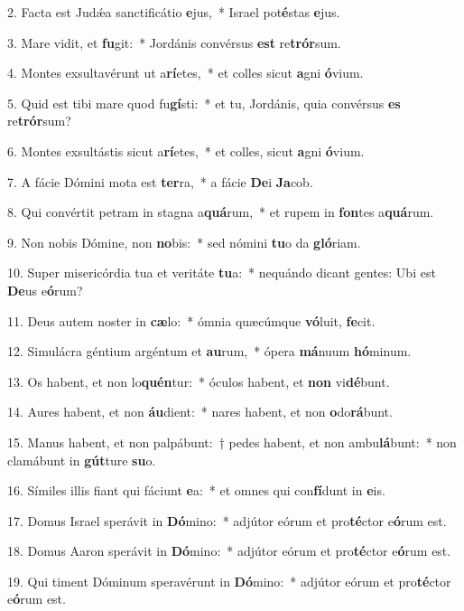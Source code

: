 \item 2. Facta est Judǽa sanctificátio \textbf{e}jus,~* Israel pot\textbf{é}stas \textbf{e}jus.
\item 3. Mare vidit, et \textbf{fu}git:~* Jordánis convérsus \textbf{est} re\textbf{trór}sum.
\item 4. Montes exsultavérunt ut a\textbf{rí}etes,~* et colles sicut \textbf{a}gni \textbf{ó}vium.
\item 5. Quid est tibi mare quod fu\textbf{gí}sti:~* et tu, Jordánis, quia convérsus \textbf{es} re\textbf{trór}sum?
\item 6. Montes exsultástis sicut a\textbf{rí}etes,~* et colles, sicut \textbf{a}gni \textbf{ó}vium.
\item 7. A fácie Dómini mota est \textbf{ter}ra,~* a fácie \textbf{De}i \textbf{Ja}cob.
\item 8. Qui convértit petram in stagna a\textbf{quá}rum,~* et rupem in \textbf{fon}tes a\textbf{quá}rum.
\item 9. Non nobis Dómine, non \textbf{no}bis:~* sed nómini \textbf{tu}o da \textbf{gló}riam.
\item 10. Super misericórdia tua et veritáte \textbf{tu}a:~* nequándo dicant gentes: Ubi est \textbf{De}us e\textbf{ó}rum?
\item 11. Deus autem noster in \textbf{cæ}lo:~* ómnia quæcúmque \textbf{vó}luit, \textbf{fe}cit.
\item 12. Simulácra géntium argéntum et \textbf{au}rum,~* ópera \textbf{má}nuum \textbf{hó}minum.
\item 13. Os habent, et non lo\textbf{quén}tur:~* óculos habent, et \textbf{non} vi\textbf{dé}bunt.
\item 14. Aures habent, et non \textbf{áu}dient:~* nares habent, et non \textbf{o}do\textbf{rá}bunt.
\item 15. Manus habent, et non palpábunt:~† pedes habent, et non ambu\textbf{lá}bunt:~* non clamábunt in \textbf{gút}ture \textbf{su}o.
\item 16. Símiles illis fiant qui fáciunt \textbf{e}a:~* et omnes qui con\textbf{fí}dunt in \textbf{e}is.
\item 17. Domus Israel sperávit in \textbf{Dó}mino:~* adjútor eórum et pro\textbf{té}ctor e\textbf{ó}rum est.
\item 18. Domus Aaron sperávit in \textbf{Dó}mino:~* adjútor eórum et pro\textbf{té}ctor e\textbf{ó}rum est.
\item 19. Qui timent Dóminum speravérunt in \textbf{Dó}mino:~* adjútor eórum et pro\textbf{té}ctor e\textbf{ó}rum est.
